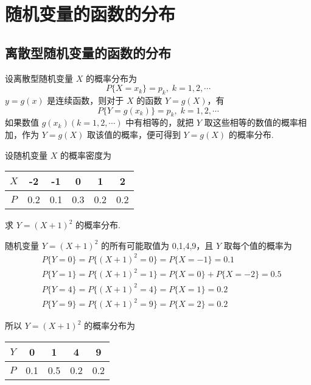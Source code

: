 \section{随机变量的函数的分布}

\subsection{离散型随机变量的函数的分布}

设离散型随机变量 $X$ 的概率分布为
$$
P\{X=x_k\}=p_k, \; k=1,2,\cdots
$$
$y=g(x)$ 是连续函数，则对于 $X$ 的函数 $Y=g(X)$，有
$$
P\{Y=g(x_k)\}=p_k, \; k=1,2,\cdots
$$
如果数值 $g(x_k)(k=1,2,\cdots)$ 中有相等的，就把 $Y$ 取这些相等的数值的概率相加，作为 $Y=g(X)$ 取该值的概率，便可得到 $Y=g(X)$ 的概率分布.

\begin{problem}
    设随机变量 $X$ 的概率密度为

    \begin{table}[htbp]
        \centering

        \begin{tabular}{c | c c c c c}
            \hline
            $X$ & -2 & -1 & 0 & 1 & 2 \\
            \hline
            $P$ & 0.2 & 0.1 & 0.3 & 0.2 & 0.2 \\
            \hline
        \end{tabular}
    \end{table}
    求 $Y=(X+1)^2$ 的概率分布.
\end{problem}

\begin{solution}
    随机变量 $Y=(X+1)^2$ 的所有可能取值为 0,1,4,9，且 $Y$ 取每个值的概率为
    \begin{align*}
        & P\{Y=0\} = P\{(X+1)^2 = 0\} = P\{X=-1\} = 0.1\\
        & P\{Y=1\} = P\{(X+1)^2 = 1\} = P\{X=0\} + P\{X=-2\} = 0.5\\
        & P\{Y=4\} = P\{(X+1)^2 = 4\} = P\{X=1\} = 0.2\\
        & P\{Y=9\} = P\{(X+1)^2 = 9\} = P\{X=2\} = 0.2
    \end{align*}
    
    所以 $Y=(X+1)^2$ 的概率分布为\newline
    
    \centering
    \begin{tabular}{c | c c c c}
        \hline
        $Y$ & 0 & 1 & 4 & 9 \\
        \hline
        $P$ & 0.1 & 0.5 & 0.2 & 0.2 \\
        \hline
    \end{tabular}
\end{solution}

